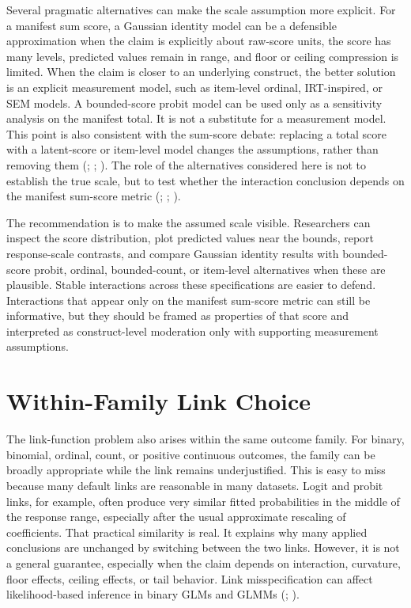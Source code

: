 \documentclass[
  man,
  longtable,
  nolmodern,
  notxfonts,
  notimes,
  colorlinks=true,linkcolor=blue,citecolor=blue,urlcolor=blue]{apa7}
\begin{document}
Several pragmatic alternatives can make the scale assumption more
explicit. For a manifest sum score, a Gaussian identity model can be a
defensible approximation when the claim is explicitly about raw-score
units, the score has many levels, predicted values remain in range, and
floor or ceiling compression is limited. When the claim is closer to an
underlying construct, the better solution is an explicit measurement
model, such as item-level ordinal, IRT-inspired, or SEM models. A
bounded-score probit model can be used only as a sensitivity analysis on
the manifest total. It is not a substitute for a measurement model. This
point is also consistent with the sum-score debate: replacing a total
score with a latent-score or item-level model changes the assumptions,
rather than removing them (;
;
). The role of the
alternatives considered here is not to establish the true scale, but to
test whether the interaction conclusion depends on the manifest
sum-score metric (; ;
).

The recommendation is to make the assumed scale visible. Researchers can
inspect the score distribution, plot predicted values near the bounds,
report response-scale contrasts, and compare Gaussian identity results
with bounded-score probit, ordinal, bounded-count, or item-level
alternatives when these are plausible. Stable interactions across these
specifications are easier to defend. Interactions that appear only on
the manifest sum-score metric can still be informative, but they should
be framed as properties of that score and interpreted as construct-level
moderation only with supporting measurement assumptions.

\section{Within-Family Link Choice}\label{within-family-link-choice}

The link-function problem also arises within the same outcome family.
For binary, binomial, ordinal, count, or positive continuous outcomes,
the family can be broadly appropriate while the link remains
underjustified. This is easy to miss because many default links are
reasonable in many datasets. Logit and probit links, for example, often
produce very similar fitted probabilities in the middle of the response
range, especially after the usual approximate rescaling of coefficients.
That practical similarity is real. It explains why many applied
conclusions are unchanged by switching between the two links. However,
it is not a general guarantee, especially when the claim depends on
interaction, curvature, floor effects, ceiling effects, or tail
behavior. Link misspecification can affect likelihood-based inference in
binary GLMs and GLMMs (; ).
\end{document}
